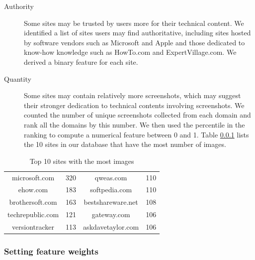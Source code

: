 \documentclass{www2010-submission}
\begin{document}
\begin{description}

\item[Authority] Some sites may be trusted by users more for their
  technical content. We identified a list of sites users
  may find authoritative, including sites hosted by software vendors
  such as Microsoft and Apple and those dedicated to know-how
  knowledge such as HowTo.com and ExpertVillage.com. We derived a
  binary feature for each site.

\item[Quantity] Some sites may contain relatively more screenshots,
  which may suggest their stronger dedication to technical contents
  involving screenshots.  We counted the number of unique screenshots
  collected from each domain and rank all the domains by this
  number. We then used the percentile in the ranking to compute a
  numerical feature between 0 and 1. Table \ref{} lists the 10 sites
  in our database that have the most number of images.








\end{description}

\begin{table}
\centering \caption{Top 10 sites with the most images}
\label{tbl:top10sites}
\begin{tabular}{|c|c||c|c|}
\hline
microsoft.com & 320 & qweas.com & 110 \\
ehow.com & 183 & softpedia.com & 110 \\
brothersoft.com & 163 & bestshareware.net & 108 \\
techrepublic.com & 121 & gateway.com & 106 \\
versiontracker & 113  & askdavetaylor.com & 106 \\  
\hline
\end{tabular}
\end{table}


\subsubsection{Setting feature weights}
\end{document}
